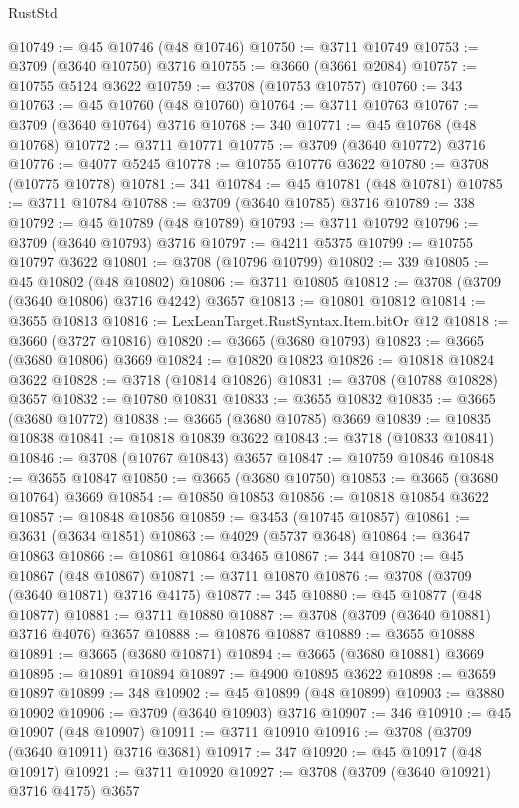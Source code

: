 \begin{lexlean}{RustStd}
\begin{coremodule}
@10749 := @45 @10746 (@48 @10746)
@10750 := @3711 @10749
@10753 := @3709 (@3640 @10750) @3716
@10755 := @3660 (@3661 @2084)
@10757 := @10755 @5124 @3622
@10759 := @3708 (@10753 @10757)
@10760 := 343
@10763 := @45 @10760 (@48 @10760)
@10764 := @3711 @10763
@10767 := @3709 (@3640 @10764) @3716
@10768 := 340
@10771 := @45 @10768 (@48 @10768)
@10772 := @3711 @10771
@10775 := @3709 (@3640 @10772) @3716
@10776 := @4077 @5245
@10778 := @10755 @10776 @3622
@10780 := @3708 (@10775 @10778)
@10781 := 341
@10784 := @45 @10781 (@48 @10781)
@10785 := @3711 @10784
@10788 := @3709 (@3640 @10785) @3716
@10789 := 338
@10792 := @45 @10789 (@48 @10789)
@10793 := @3711 @10792
@10796 := @3709 (@3640 @10793) @3716
@10797 := @4211 @5375
@10799 := @10755 @10797 @3622
@10801 := @3708 (@10796 @10799)
@10802 := 339
@10805 := @45 @10802 (@48 @10802)
@10806 := @3711 @10805
@10812 := @3708 (@3709 (@3640 @10806) @3716 @4242) @3657
@10813 := @10801 @10812
@10814 := @3655 @10813
@10816 := LexLeanTarget.RustSyntax.Item.bitOr @12
@10818 := @3660 (@3727 @10816)
@10820 := @3665 (@3680 @10793)
@10823 := @3665 (@3680 @10806) @3669
@10824 := @10820 @10823
@10826 := @10818 @10824 @3622
@10828 := @3718 (@10814 @10826)
@10831 := @3708 (@10788 @10828) @3657
@10832 := @10780 @10831
@10833 := @3655 @10832
@10835 := @3665 (@3680 @10772)
@10838 := @3665 (@3680 @10785) @3669
@10839 := @10835 @10838
@10841 := @10818 @10839 @3622
@10843 := @3718 (@10833 @10841)
@10846 := @3708 (@10767 @10843) @3657
@10847 := @10759 @10846
@10848 := @3655 @10847
@10850 := @3665 (@3680 @10750)
@10853 := @3665 (@3680 @10764) @3669
@10854 := @10850 @10853
@10856 := @10818 @10854 @3622
@10857 := @10848 @10856
@10859 := @3453 (@10745 @10857)
@10861 := @3631 (@3634 @1851)
@10863 := @4029 (@5737 @3648)
@10864 := @3647 @10863
@10866 := @10861 @10864 @3465
@10867 := 344
@10870 := @45 @10867 (@48 @10867)
@10871 := @3711 @10870
@10876 := @3708 (@3709 (@3640 @10871) @3716 @4175)
@10877 := 345
@10880 := @45 @10877 (@48 @10877)
@10881 := @3711 @10880
@10887 := @3708 (@3709 (@3640 @10881) @3716 @4076) @3657
@10888 := @10876 @10887
@10889 := @3655 @10888
@10891 := @3665 (@3680 @10871)
@10894 := @3665 (@3680 @10881) @3669
@10895 := @10891 @10894
@10897 := @4900 @10895 @3622
@10898 := @3659 @10897
@10899 := 348
@10902 := @45 @10899 (@48 @10899)
@10903 := @3880 @10902
@10906 := @3709 (@3640 @10903) @3716
@10907 := 346
@10910 := @45 @10907 (@48 @10907)
@10911 := @3711 @10910
@10916 := @3708 (@3709 (@3640 @10911) @3716 @3681)
@10917 := 347
@10920 := @45 @10917 (@48 @10917)
@10921 := @3711 @10920
@10927 := @3708 (@3709 (@3640 @10921) @3716 @4175) @3657

\end{coremodule}
\end{lexlean}

